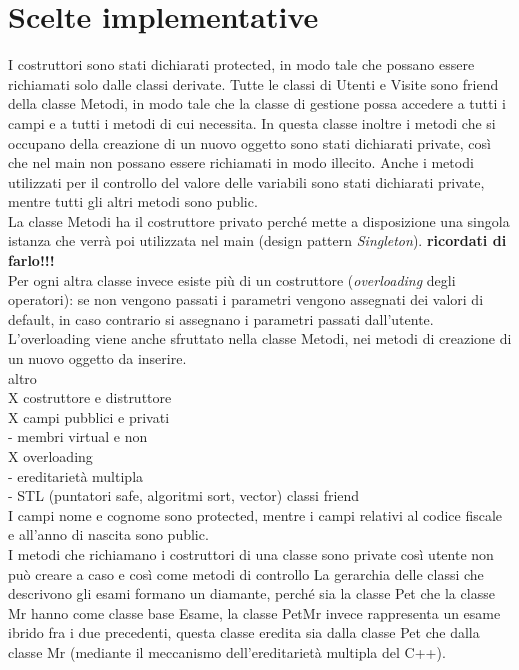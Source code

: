 \documentclass[a4paper,12pt]{article}
\begin{document}
{%
\clearpage
\newpage
\section*{Scelte implementative} 
I costruttori sono stati dichiarati protected, in modo tale che possano essere richiamati solo dalle classi derivate. Tutte le classi di Utenti e Visite sono friend della classe Metodi, in modo tale che la classe di gestione possa accedere a tutti i campi e a tutti i metodi di cui necessita. In questa classe inoltre i metodi che si occupano della creazione di un nuovo oggetto sono stati dichiarati private, così che nel main non possano essere richiamati in modo illecito. Anche i metodi utilizzati per il controllo del valore delle variabili sono stati dichiarati private, mentre tutti gli altri metodi sono public. \\
La classe Metodi ha il costruttore privato perché mette a disposizione una singola istanza che verrà poi utilizzata nel main (design pattern \textit{Singleton}). \textbf{ricordati di farlo!!!}\\
Per ogni altra classe invece esiste più di un costruttore (\textit{overloading} degli operatori): se non vengono passati i parametri vengono assegnati dei valori di default, in caso contrario si assegnano i parametri passati dall'utente. L'overloading viene anche sfruttato nella classe Metodi, nei metodi di creazione di un nuovo oggetto da inserire. \\
altro
\\X costruttore e distruttore \\
X campi pubblici e privati \\
- membri virtual e non \\
X overloading \\
- ereditarietà multipla \\
- STL (puntatori safe, algoritmi sort, vector)
classi friend\\
 I campi nome e cognome sono protected, mentre i campi relativi al codice fiscale e all’anno di nascita sono public. \\
I metodi che richiamano i costruttori di una classe sono private così utente non può creare a caso e così come metodi di controllo
La gerarchia delle classi che descrivono gli esami formano un diamante, perché sia la classe Pet che la classe Mr hanno come classe base Esame, la classe PetMr invece rappresenta un esame ibrido fra i due precedenti, questa classe eredita sia dalla classe Pet che dalla classe Mr (mediante il meccanismo dell’ereditarietà multipla del C++). 







}
\end{document}
